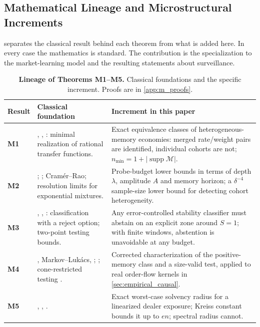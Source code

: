 \documentclass[10pt,twocolumn,letterpaper]{article}
\theoremstyle{definition}
\theoremstyle{remark}
\begin{document}
\subsection{Mathematical Lineage and Microstructural Increments}
\label{sec:lineage}

 separates the classical result behind each theorem from what is added here. In every case the mathematics is standard. The contribution is the specialization to the market-learning model and the resulting statements about surveillance.

\begin{table}[t]
\centering\small
\caption{\textbf{Lineage of Theorems M1--M5.} Classical foundations and the specific increment. Proofs are in \cref{app:m_proofs}.}
\label{tab:lineage}
\begin{tabularx}{\textwidth}{lp{}X}
\toprule
\textbf{Result} & \textbf{Classical foundation} & \textbf{Increment in this paper} \\
\midrule
\textbf{M1} & \citet{kalman1960}, \citet{gilbert1963}, \citet{ho1966}: minimal realization of rational transfer functions. & Exact equivalence classes of heterogeneous-memory economies: merged rate/weight pairs are identified, individual cohorts are not; $n_{\min}=1+|\operatorname{supp}\mathcal M|$. \\
\midrule
\textbf{M2} & \citet{lecam1973}; \citet{chen1995optimal,heinrich2018,wuyang2020}; Cram\'er--Rao; resolution limits for exponential mixtures. & Probe-budget lower bounds in terms of depth $\lambda$, amplitude $A$ and memory horizon; a $\delta^{-4}$ sample-size lower bound for detecting cohort heterogeneity. \\
\midrule
\textbf{M3} & \citet{chow1970}, \citet{herbei2006}, \citet{geifman2017}: classification with a reject option; two-point testing bounds. & Any error-controlled stability classifier must abstain on an explicit zone around $S=1$; with finite windows, abstention is unavoidable at any budget. \\
\midrule
\textbf{M4} & \citet{hausdorff1921}, Markov--Luk\'acs, \citet{krein1977}; \citet{milanese1991,calafiore2005}; cone-restricted testing \citep{perlman1969}. & Corrected characterization of the positive-memory class and a size-valid test, applied to real order-flow kernels in \cref{sec:empirical_causal}. \\
\midrule
\textbf{M5} & \citet{kreiss1962}, \citet{spijker1991}, \citet{trefethen2005spectra}. & Exact worst-case solvency radius for a linearized dealer exposure; Kreiss constant bounds it up to $en$; spectral radius cannot. \\
\bottomrule
\end{tabularx}
\end{table}
\end{document}
